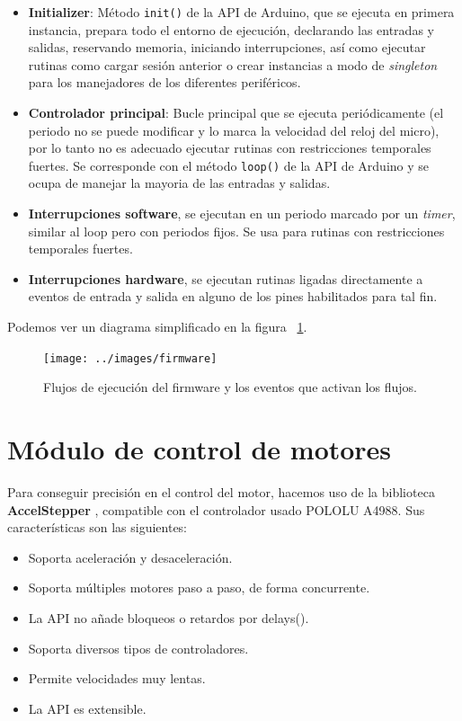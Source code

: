 \begin{itemize}
	\item \textbf{Initializer}: Método \texttt{init()} de la API de Arduino, que se ejecuta en primera instancia, prepara todo el entorno de ejecución, declarando las entradas y salidas, reservando memoria, iniciando interrupciones, así como ejecutar rutinas como cargar sesión anterior o crear instancias a modo de \textit{singleton} para los manejadores de los diferentes periféricos. 
	
	\item \textbf{Controlador principal}: Bucle principal que se ejecuta periódicamente (el periodo no se puede modificar y lo marca la velocidad del reloj del micro), por lo tanto no es adecuado ejecutar rutinas con restricciones temporales fuertes. Se corresponde con el método \texttt{loop()} de la API de Arduino y se ocupa de manejar la mayoria de las entradas y salidas.
	
	\item \textbf{Interrupciones software}, se ejecutan en un periodo marcado por un \textit{timer}, similar al loop pero con periodos fijos. Se usa para rutinas con restricciones temporales fuertes.
	
	\item \textbf{Interrupciones hardware}, se ejecutan rutinas ligadas directamente a eventos de entrada y salida en alguno de los pines habilitados para tal fin. 
\end{itemize}

Podemos ver un diagrama simplificado en la figura~ \ref{fig:arquitectura_firmware}.

\begin{figure}[h]
\centering
\texttt{[image: ../images/firmware]}
\caption[Gráfico de flujos de ejecución]{Flujos de ejecución del firmware y los eventos que activan los flujos.}
\label{fig:arquitectura_firmware}
\end{figure}


\section{Módulo de control de motores}

Para conseguir precisión en el control del motor, hacemos uso de la biblioteca \textbf{AccelStepper} \cite{accelstp}, compatible con el controlador usado POLOLU A4988. Sus características son las siguientes:

\begin{itemize}
	\item Soporta aceleración y desaceleración.
	\item Soporta múltiples motores paso a paso, de forma concurrente.
	\item La API no añade bloqueos o retardos por delays().
	\item Soporta diversos tipos de controladores.
	\item Permite velocidades muy lentas.
	\item La API es extensible.
\end{itemize} 

